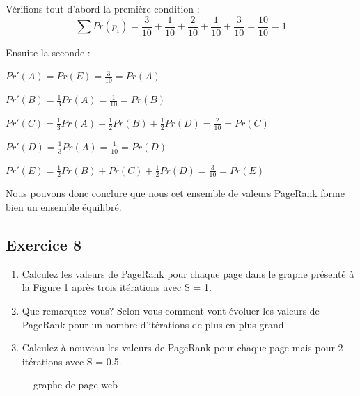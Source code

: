    Vérifions tout d'abord la première condition :
    $$ \sum Pr(p_i) = \frac{3}{10} + \frac{1}{10} + \frac{2}{10}  + \frac{1}{10}+  \frac{3}{10} = \frac{10}{10} = 1 $$

    Ensuite la seconde :
    \begin{description}
        \item $Pr'(A) = Pr(E) = \frac{3}{10} = Pr(A)$
        \item $Pr'(B) = \frac{1}{3} Pr(A) = \frac{1}{10} = Pr(B)$
        \item $Pr'(C) = \frac{1}{3} Pr(A) + \frac{1}{2} Pr(B) + \frac{1}{2} Pr(D) = \frac{2}{10} = Pr(C)$
        \item $Pr'(D) = \frac{1}{3} Pr(A) = \frac{1}{10} = Pr(D)$
        \item $Pr'(E) = \frac{1}{2} Pr(B) + Pr(C) + \frac{1}{2} Pr(D) = \frac{3}{10} = Pr(E)$\\
    \end{description}

    Nous pouvons donc conclure que nous cet ensemble de valeurs PageRank forme bien un ensemble équilibré.


\subsection*{Exercice 8}
		\begin{enumerate}
				\item Calculez les valeurs de PageRank pour chaque page dans le graphe présenté à la Figure \ref{fig:blackhole} après trois itérations avec S = 1.
				\item Que remarquez-vous? Selon vous comment vont évoluer les valeurs
						de PageRank pour un nombre d'itérations de plus en plus grand
				\item Calculez à nouveau les valeurs de PageRank pour chaque page mais pour 2 itérations avec S = 0.5.
		\end{enumerate}

    \begin{figure}[ht!]
	\centering

\caption{graphe de page web}
\label{fig:blackhole}
\end{figure}

